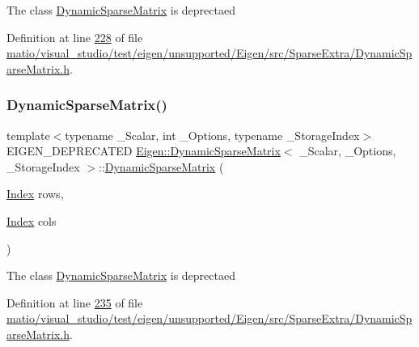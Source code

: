 The class \hyperlink{class_eigen_1_1_dynamic_sparse_matrix}{Dynamic\+Sparse\+Matrix} is deprectaed 

Definition at line \hyperlink{matio_2visual__studio_2test_2eigen_2unsupported_2_eigen_2src_2_sparse_extra_2_dynamic_sparse_matrix_8h_source_l00228}{228} of file \hyperlink{matio_2visual__studio_2test_2eigen_2unsupported_2_eigen_2src_2_sparse_extra_2_dynamic_sparse_matrix_8h_source}{matio/visual\+\_\+studio/test/eigen/unsupported/\+Eigen/src/\+Sparse\+Extra/\+Dynamic\+Sparse\+Matrix.\+h}.

\mbox{\label{class_eigen_1_1_dynamic_sparse_matrix_ad1c810ff3cfcc97db704d26b9d114f94}} 
\subsubsection{\texorpdfstring{Dynamic\+Sparse\+Matrix()}{DynamicSparseMatrix()}\hspace{0.1cm}{\footnotesize\ttfamily [5/6]}}
{\footnotesize\ttfamily template$<$typename \+\_\+\+Scalar, int \+\_\+\+Options, typename \+\_\+\+Storage\+Index$>$ \\
E\+I\+G\+E\+N\+\_\+\+D\+E\+P\+R\+E\+C\+A\+T\+ED \hyperlink{class_eigen_1_1_dynamic_sparse_matrix}{Eigen\+::\+Dynamic\+Sparse\+Matrix}$<$ \+\_\+\+Scalar, \+\_\+\+Options, \+\_\+\+Storage\+Index $>$\+::\hyperlink{class_eigen_1_1_dynamic_sparse_matrix}{Dynamic\+Sparse\+Matrix} (\begin{DoxyParamCaption}\item[{\hyperlink{group___core___module_a554f30542cc2316add4b1ea0a492ff02}{Index}}]{rows,  }\item[{\hyperlink{group___core___module_a554f30542cc2316add4b1ea0a492ff02}{Index}}]{cols }\end{DoxyParamCaption})\hspace{0.3cm}{\ttfamily [inline]}}

The class \hyperlink{class_eigen_1_1_dynamic_sparse_matrix}{Dynamic\+Sparse\+Matrix} is deprectaed 

Definition at line \hyperlink{matio_2visual__studio_2test_2eigen_2unsupported_2_eigen_2src_2_sparse_extra_2_dynamic_sparse_matrix_8h_source_l00235}{235} of file \hyperlink{matio_2visual__studio_2test_2eigen_2unsupported_2_eigen_2src_2_sparse_extra_2_dynamic_sparse_matrix_8h_source}{matio/visual\+\_\+studio/test/eigen/unsupported/\+Eigen/src/\+Sparse\+Extra/\+Dynamic\+Sparse\+Matrix.\+h}.

